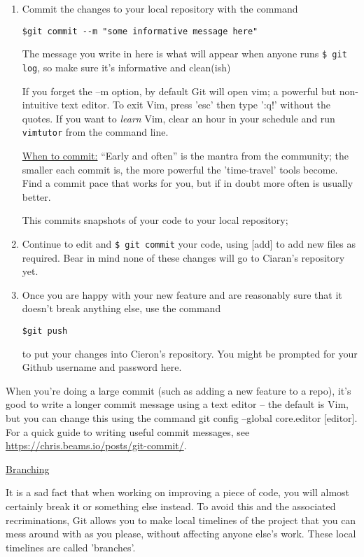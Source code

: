 \documentclass[11pt, a4paper, english]{article}
\newenvironment{wrapbox}
	{
		\begin{tcolorbox}
	}
	{
		\end{tcolorbox}
	}
\begin{document}
\begin{enumerate}
\item Commit the changes to your local repository with the command
\begin{verbatim}
$git commit --m "some informative message here"
\end{verbatim}
The message you write in here is what will appear when anyone runs \verb|$ git log|, so make sure it's informative and clean(ish)
\begin{wrapbox}
If you forget the --m option, by default Git will open vim; a powerful but non-intuitive text editor. To exit Vim, press 'esc' then type ':q!' without the quotes. If you want to \textit{learn} Vim, clear an hour in your schedule and run \verb|vimtutor| from the command line.
\end{wrapbox}
\begin{wrapbox} \underline{When to commit:} “Early and often” is the mantra from the community; the smaller each commit is, the more powerful the 'time-travel' tools become. Find a commit pace that works for you, but if in doubt more often is usually better.
\end{wrapbox}
This commits snapshots of your code to your local repository; 
\item Continue to edit and \verb|$ git commit| your code, using [add] to add new files as required. Bear in mind none of these changes will go to Ciaran's repository yet.
\item Once you are happy with your new feature and are reasonably sure that it doesn't break anything else, use the command
\begin{verbatim}
$git push
\end{verbatim}
to put your changes into Cieron's repository. You might be prompted for your Github username and password here.
\end{enumerate}

\begin{wrapbox}
When you're doing a large commit (such as adding a new feature to a repo), it's good to write a longer commit message using a text editor -- the default is Vim, but you can change this using the command git config --global core.editor [editor]. For a quick guide to writing useful commit messages, see \url{https://chris.beams.io/posts/git-commit/}.
\end{wrapbox}

\underline{Branching}

It is a sad fact that when working on improving a piece of code, you will almost certainly break it or something else instead. To avoid this and the associated recriminations, Git allows you to make local timelines of the project that you can mess around with as you please, without affecting anyone else's work. These local timelines are called 'branches'.
\end{document}
